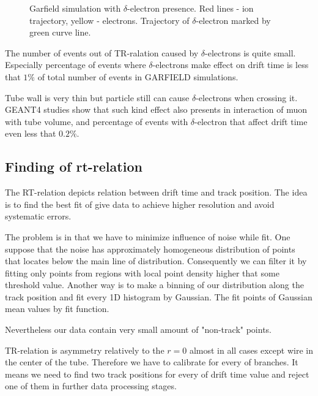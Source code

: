 	\begin{figure}[h!]
		\centering
		\qquad
		\caption{Garfield simulation with $\delta$-electron presence. Red lines - ion trajectory, yellow - electrons. Trajectory of $\delta$-electron marked by green curve line.}			
	\end{figure}	
	
	The number of events out of TR-ralation caused by $\delta$-electrons is quite small. Especially percentage of events where $\delta$-electrons make effect on drift time is less that $1\%$ of total number of events  in GARFIELD simulations. 
	
	Tube wall is very thin but particle still can cause $\delta$-electrons when crossing it. GEANT4 studies show that such kind effect also presents in interaction of muon with tube volume, and percentage of events with $\delta$-electron that affect drift time even less that $0.2\%$.
	
	\subsection{Finding of rt-relation}
	
	The RT-relation depicts relation between drift time and track position. The idea is to find the best fit of give data to achieve higher resolution and avoid systematic errors.
	
	The problem is in that we have to minimize influence of noise while fit. One suppose that the noise has approximately homogeneous distribution of points that locates below the main line of distribution. Consequently we can filter it by fitting only points from regions with local point density higher that some threshold value. Another way is to make a binning of our distribution along the track position and fit every 1D histogram by Gaussian. The fit points of Gaussian mean values by fit function.    
	
	Nevertheless our data contain very small amount of "non-track" points.
	
	TR-relation is asymmetry relatively to the $r=0$ almost in all cases except wire in the center of the tube. Therefore we have to calibrate for every of branches. It means we need to find two track positions for every of drift time value and reject one of them in further data processing stages.
	
